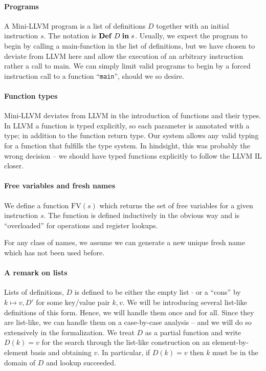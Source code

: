 \documentclass[a4paper, oneside, 10pt, final]{memoir}
\begin{document}
\paragraph{Programs}

A Mini-LLVM program is a list of definitions $D$ together with an
initial instruction $s$. The notation is $\mathbf{Def} \; D \; \mathbf{in} \; s$. Usually, we
expect the program to begin by calling a main-function in the list of
definitions, but we have chosen to deviate from LLVM here and allow
the execution of an arbitrary instruction rather a call to main. We
can simply limit valid programs to begin by a forced instruction
call to a function ``\texttt{main}'', should we so desire.

\paragraph{Function types}

Mini-LLVM deviates from LLVM in the introduction of functions and
their types. In LLVM a function is typed explicitly, so each parameter
is annotated with a type; in addition to the function return type. Our
system allows any valid typing for a function that fulfills the type
system. In hindsight, this was probably the wrong decision -- we
should have typed functions explicitly to follow the LLVM IL closer.

\paragraph{Free variables and fresh names}
\newcommand{\fv}{\mathrm{FV}}
We define a function $\fv(s)$ which returns the set of free variables
for a given instruction $s$. The function is defined inductively in
the obvious way and is ``overloaded'' for operations and register
lookups.

For any class of names, we assume we can generate a new unique fresh
name which has not been used before.

\paragraph{A remark on lists}

Lists of definitions, $D$ is defined to be either the empty list
$\cdot$ or a ``cons'' by $k \mapsto v,D'$ for some key/value pair
$k,v$. We will be introducing several list-like definitions of this
form. Hence, we will handle them once and for all. Since they are
list-like, we can handle them on a case-by-case analysis -- and we
will do so extensively in the formalization. We treat $D$ as
a partial function and write $D(k) = v$ for the search through the
list-like construction on an element-by-element basis and obtaining
$v$. In particular, if $D(k) = v$ then $k$ must be in the domain of
$D$ and lookup succeeded.
\end{document}
